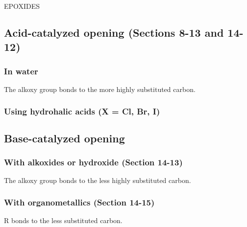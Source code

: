 {\large EPOXIDES}

\subsection{Acid-catalyzed opening \normalfont(Sections 8-13 and 14-12)}

\subsubsection{In water}

The alkoxy group bonds to the more highly substituted carbon.

\subsubsection{Using hydrohalic acids (X = Cl, Br, I)}



\subsection{Base-catalyzed opening}

\subsubsection{With alkoxides or hydroxide \normalfont(Section 14-13)}

The alkoxy group bonds to the less highly substituted carbon.

\subsubsection{With organometallics \normalfont(Section 14-15)}

R bonds to the less substituted carbon.





